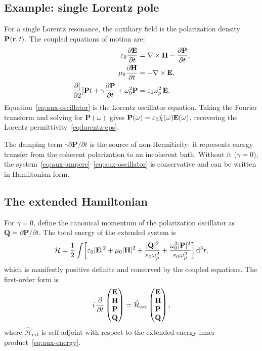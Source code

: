 \subsection{Example: single Lorentz pole}
\label{ssec:aux-single-pole}

For a single Lorentz resonance, the auxiliary field is the polarization
density $\mathbf{P}(\mathbf{r},t)$. The coupled equations of motion are:
\begin{align}
 \varepsilon_0\frac{\partial \mathbf{E}}{\partial t} &= \nabla\times\mathbf{H} - \frac{\partial \mathbf{P}}{\partial t},
 \label{eq:aux-ampere}\\
 \mu_0\frac{\partial \mathbf{H}}{\partial t} &= -\nabla\times\mathbf{E},
 \label{eq:aux-faraday}\\
 \frac{\partial [}{\partial 2}]{\mathbf{P}}{t} + \gamma\frac{\partial \mathbf{P}}{\partial t} + \omega_0^2\mathbf{P}
 &= \varepsilon_0\omega_p^2\,\mathbf{E}.
 \label{eq:aux-oscillator}
\end{align}
Equation~\eqref{eq:aux-oscillator} is the Lorentz oscillator equation.
Taking the Fourier transform and solving for $\mathbf{P}(\omega)$ gives
$\mathbf{P}(\omega) = \varepsilon_0\hat{\chi}(\omega)\mathbf{E}(\omega)$, recovering
the Lorentz permittivity~\eqref{eq:lorentz-eps}.

The damping term $\gamma\partial\mathbf{P}/\partial t$ is the source of
non-Hermiticity: it represents energy transfer from the coherent
polarization to an incoherent bath. Without it ($\gamma = 0$), the
system~\eqref{eq:aux-ampere}--\eqref{eq:aux-oscillator} is
conservative and can be written in Hamiltonian form.

\subsection{The extended Hamiltonian}
\label{ssec:extended-hamiltonian}

For $\gamma = 0$, define the canonical momentum of the polarization
oscillator as $\mathbf{Q} = \partial\mathbf{P}/\partial t$. The total
energy of the extended system is
\begin{equation}
 \mathcal{H} = \frac{1}{2}\int\!\left[
 \varepsilon_0|\mathbf{E}|^2 + \mu_0|\mathbf{H}|^2
 + \frac{|\mathbf{Q}|^2}{\varepsilon_0\omega_p^2}
 + \frac{\omega_0^2|\mathbf{P}|^2}{\varepsilon_0\omega_p^2}
 \right]\mathop{}\!\mathrm{d}^3r,
 \label{eq:aux-energy}
\end{equation}
which is manifestly positive definite and conserved by the coupled
equations. The first-order form is
\begin{equation}
 i\,\frac{\partial }{\partial t}
 \begin{pmatrix} \mathbf{E} \\ \mathbf{H} \\ \mathbf{P} \\ \mathbf{Q} \end{pmatrix}
 = \hat{\mathcal{H}}_{\mathrm{ext}}
 \begin{pmatrix} \mathbf{E} \\ \mathbf{H} \\ \mathbf{P} \\ \mathbf{Q} \end{pmatrix},
 \label{eq:extended-system}
\end{equation}
where $\hat{\mathcal{H}}_{\mathrm{ext}}$ is self-adjoint with respect to
the extended energy inner product~\eqref{eq:aux-energy}.

